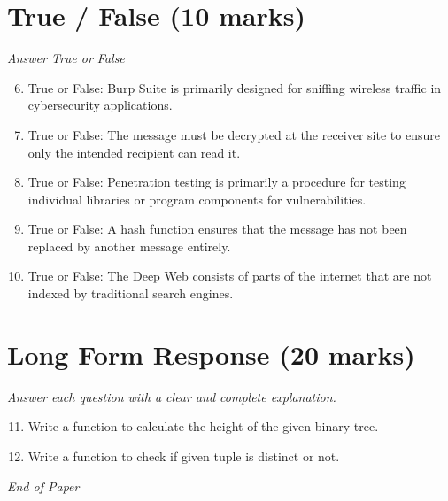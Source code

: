 \documentclass[12pt]{article}
\begin{document}
\section*{True / False (10 marks)}
\textit{Answer True or False}
\begin{enumerate}[label=\arabic*.]
\setcounter{enumi}{5}
\item True or False: Burp Suite is primarily designed for sniffing wireless traffic in cybersecurity applications.
\item True or False: The message must be decrypted at the receiver site to ensure only the intended recipient can read it.
\item True or False: Penetration testing is primarily a procedure for testing individual libraries or program components for vulnerabilities.
\item True or False: A hash function ensures that the message has not been replaced by another message entirely.
\item True or False: The Deep Web consists of parts of the internet that are not indexed by traditional search engines.
\end{enumerate}

\section*{Long Form Response (20 marks)}
\textit{Answer each question with a clear and complete explanation.}
\begin{enumerate}[label=\arabic*.]
\setcounter{enumi}{10}
\item Write a function to calculate the height of the given binary tree.
\item Write a function to check if given tuple is distinct or not.
\end{enumerate}

\vfill
\noindent\textit{End of Paper}
\end{document}
